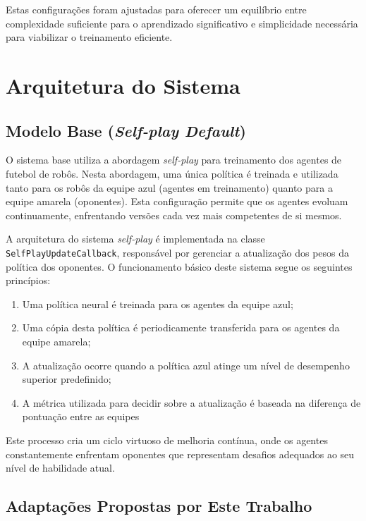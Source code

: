 Estas configurações foram ajustadas para oferecer um equilíbrio entre complexidade suficiente para o aprendizado significativo e simplicidade necessária para viabilizar o treinamento eficiente.

\section{Arquitetura do Sistema}
\label{sec:arquitetura_sistema}

\subsection{Modelo Base (\textit{Self-play Default})}

O sistema base utiliza a abordagem \textit{self-play} para treinamento dos agentes de futebol de robôs. Nesta abordagem, uma única política é treinada e utilizada tanto para os robôs da equipe azul (agentes em treinamento) quanto para a equipe amarela (oponentes). Esta configuração permite que os agentes evoluam continuamente, enfrentando versões cada vez mais competentes de si mesmos.

A arquitetura do sistema \textit{self-play} é implementada na classe \texttt{SelfPlayUpdateCallback}, responsável por gerenciar a atualização dos pesos da política dos oponentes. O funcionamento básico deste sistema segue os seguintes princípios:

\begin{enumerate}
    \item Uma política neural é treinada para os agentes da equipe azul;
    \item Uma cópia desta política é periodicamente transferida para os agentes da equipe amarela;
    \item A atualização ocorre quando a política azul atinge um nível de desempenho superior predefinido;
    \item A métrica utilizada para decidir sobre a atualização é baseada na diferença de pontuação entre as equipes
\end{enumerate}

Este processo cria um ciclo virtuoso de melhoria contínua, onde os agentes constantemente enfrentam oponentes que representam desafios adequados ao seu nível de habilidade atual.

\subsection{Adaptações Propostas por Este Trabalho}

